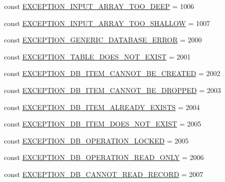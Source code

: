 \begin{DoxyCompactItemize}
\item 
const \hyperlink{class_database_exception_a86c756dcdcdc0d6a13363e420b4b1ed6}{E\+X\+C\+E\+P\+T\+I\+O\+N\+\_\+\+I\+N\+P\+U\+T\+\_\+\+A\+R\+R\+A\+Y\+\_\+\+T\+O\+O\+\_\+\+D\+E\+E\+P} = 1006
\item 
const \hyperlink{class_database_exception_ab8d6e239e0336ea8b8e1203f6c38f3c7}{E\+X\+C\+E\+P\+T\+I\+O\+N\+\_\+\+I\+N\+P\+U\+T\+\_\+\+A\+R\+R\+A\+Y\+\_\+\+T\+O\+O\+\_\+\+S\+H\+A\+L\+L\+O\+W} = 1007
\item 
const \hyperlink{class_database_exception_a54384c002df87b714c8cd0d27db21f85}{E\+X\+C\+E\+P\+T\+I\+O\+N\+\_\+\+G\+E\+N\+E\+R\+I\+C\+\_\+\+D\+A\+T\+A\+B\+A\+S\+E\+\_\+\+E\+R\+R\+O\+R} = 2000
\item 
const \hyperlink{class_database_exception_a8c1f734137128a0b3a7ab767e583e7ad}{E\+X\+C\+E\+P\+T\+I\+O\+N\+\_\+\+T\+A\+B\+L\+E\+\_\+\+D\+O\+E\+S\+\_\+\+N\+O\+T\+\_\+\+E\+X\+I\+S\+T} = 2001
\item 
const \hyperlink{class_database_exception_ae8c6c4d6c53676f4dfc17c3acbc4e86a}{E\+X\+C\+E\+P\+T\+I\+O\+N\+\_\+\+D\+B\+\_\+\+I\+T\+E\+M\+\_\+\+C\+A\+N\+N\+O\+T\+\_\+\+B\+E\+\_\+\+C\+R\+E\+A\+T\+E\+D} = 2002
\item 
const \hyperlink{class_database_exception_a0d11e2b4e48912224166b8733bf7cee8}{E\+X\+C\+E\+P\+T\+I\+O\+N\+\_\+\+D\+B\+\_\+\+I\+T\+E\+M\+\_\+\+C\+A\+N\+N\+O\+T\+\_\+\+B\+E\+\_\+\+D\+R\+O\+P\+P\+E\+D} = 2003
\item 
const \hyperlink{class_database_exception_a3adbce979bbf4f1f99b59bb62555307f}{E\+X\+C\+E\+P\+T\+I\+O\+N\+\_\+\+D\+B\+\_\+\+I\+T\+E\+M\+\_\+\+A\+L\+R\+E\+A\+D\+Y\+\_\+\+E\+X\+I\+S\+T\+S} = 2004
\item 
const \hyperlink{class_database_exception_a051a953b3dbf5c69685ae0905d68a2cb}{E\+X\+C\+E\+P\+T\+I\+O\+N\+\_\+\+D\+B\+\_\+\+I\+T\+E\+M\+\_\+\+D\+O\+E\+S\+\_\+\+N\+O\+T\+\_\+\+E\+X\+I\+S\+T} = 2005
\item 
const \hyperlink{class_database_exception_aafe8d0c8826d17ec598136f35e381524}{E\+X\+C\+E\+P\+T\+I\+O\+N\+\_\+\+D\+B\+\_\+\+O\+P\+E\+R\+A\+T\+I\+O\+N\+\_\+\+L\+O\+C\+K\+E\+D} = 2005
\item 
const \hyperlink{class_database_exception_a314fb08476b7cab00496a16cfa30708f}{E\+X\+C\+E\+P\+T\+I\+O\+N\+\_\+\+D\+B\+\_\+\+O\+P\+E\+R\+A\+T\+I\+O\+N\+\_\+\+R\+E\+A\+D\+\_\+\+O\+N\+L\+Y} = 2006
\item 
const \hyperlink{class_database_exception_af4c8c1347d3322d171c556f518fb75a6}{E\+X\+C\+E\+P\+T\+I\+O\+N\+\_\+\+D\+B\+\_\+\+C\+A\+N\+N\+O\+T\+\_\+\+R\+E\+A\+D\+\_\+\+R\+E\+C\+O\+R\+D} = 2007

\end{DoxyCompactItemize}

